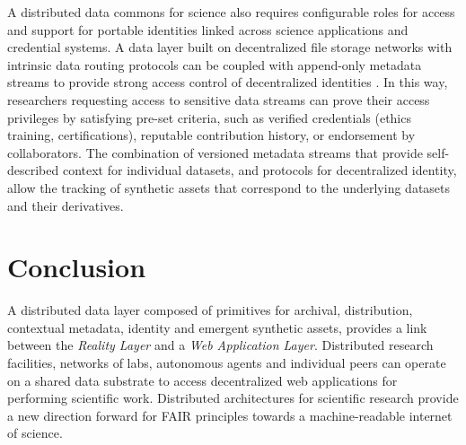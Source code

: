 \documentclass[conference]{IEEEtran}
\begin{document}
A distributed data commons for science also requires configurable roles for access and support for portable identities linked across science applications and credential systems. A data layer built on decentralized file storage networks with intrinsic data routing protocols can be coupled with append-only metadata streams to provide strong access control of decentralized identities \cite{ceramic-intro}. In this way, researchers requesting access to sensitive data streams can prove their access privileges by satisfying pre-set criteria, such as verified credentials (ethics training, certifications), reputable contribution history, or endorsement by collaborators.  The combination of versioned metadata streams that provide self-described context for individual datasets, and protocols for decentralized identity, allow the tracking of synthetic assets that correspond to the underlying datasets and their derivatives. 
\section{Conclusion}
A distributed data layer composed of primitives for archival, distribution, contextual metadata, identity and emergent synthetic assets, provides a link between the \textit{Reality Layer} and a \textit{Web Application Layer}. Distributed research facilities, networks of labs, autonomous agents and individual peers can operate on a shared data substrate to access decentralized web applications for performing scientific work. Distributed architectures for scientific research provide a new direction forward for FAIR principles towards a machine-readable internet of science. 


\end{document}
